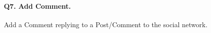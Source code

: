 \paragraph{\textbf{Q7}. Add Comment.}
Add a Comment replying to a Post/Comment to the social network.
